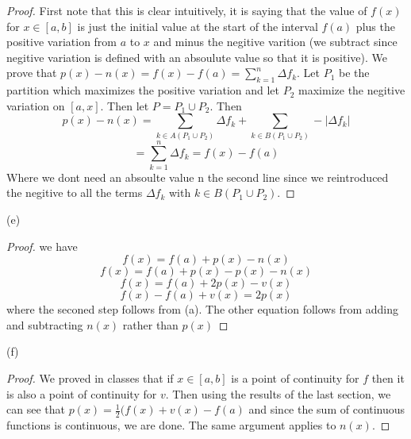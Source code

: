\documentclass[11pt,largemargins]{homework}
\begin{document}
\begin{alphaparts}
\begin{proof} 
	First note that this is clear intuitively, it is saying that the value of $f(x)$ for $x \in [a,b]$ is just the initial value at the start of the interval $f(a)$ plus the positive variation from $a$ to $x$ and minus the negitive varition (we subtract since negitive variation is defined with an absoulute value so that it is positive). We prove that $p(x) - n(x) = f(x) - f(a) = \sum_{k = 1}^n \Delta f_k$. Let $P_1$ be the partition which maximizes the positive variation and let $P_2$ maximize the negitive variation on $[a, x]$. Then let $P = P_1 \cup P_2$.  Then 
	\[ p(x) - n(x) = \sum_{k \in A(P_1 \cup P_2)} \Delta f_k + \sum_{k \in B(P_1 \cup P_2) } - |\Delta f_k| \] 
\[ = \sum_{k = 1}^n \Delta f_k = f(x) - f(a) \] 
Where we dont need an absoulte value n the second line since we reintroduced the negitive to all the terms $\Delta f_k$ with $k \in B(P_1 \cup P_2)$. 
\end{proof}

\questionpart
(e) 
\begin{proof} we have 
	\[ f(x) = f(a) + p(x) - n(x) \] 
	\[ f(x) = f(a) + p(x) - p(x) - n(x) \] 
	\[ f(x) = f(a) + 2p(x) - v(x) \] 
	\[f(x) - f(a) + v(x) = 2p(x) \] 
	where the seconed step follows from (a). The other equation follows from adding and subtracting $n(x)$ rather than $p(x)$ 
\end{proof}

\questionpart 
(f) 
\begin{proof} 

	We proved in classes that if $x \in [a, b]$ is a point of continuity for $f$ then it is also a point of continuity for $v$. Then using 
	the results of the last section, we can see that $p(x) = \frac{1}{2} (f(x) + v(x) - f(a)$ and since the sum of continuous functions is continuous, 
	we are done. The same argument applies to $n(x)$. 
\end{proof} 
\end{alphaparts}
 

\end{document}
